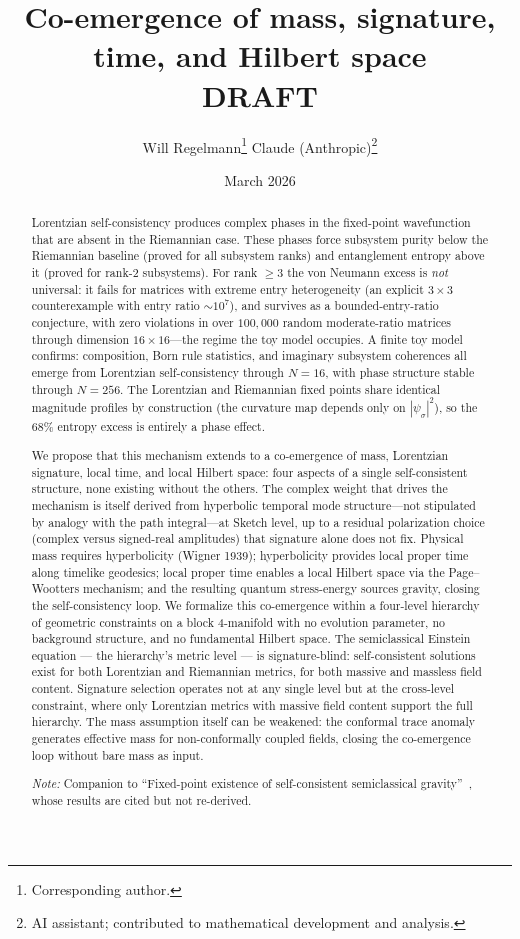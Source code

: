 \documentclass[12pt,a4paper]{article}
\title{\textbf{Co-emergence of mass, signature, time, and Hilbert space}\\[6pt]
{\large DRAFT}}
\author{Will Regelmann\thanks{Corresponding author.} \quad Claude (Anthropic)\thanks{AI
assistant; contributed to mathematical development and analysis.}}
\date{March 2026}
\theoremstyle{definition}
\theoremstyle{remark}
\begin{document}
\maketitle

\begin{abstract}
Lorentzian self-consistency produces complex phases in the fixed-point
wavefunction that are absent in the Riemannian case. These phases force
subsystem purity below the Riemannian baseline (proved for all
subsystem ranks) and entanglement entropy above it (proved for rank-2
subsystems). For rank $\geq 3$ the von Neumann excess is \emph{not}
universal: it fails for matrices with extreme entry heterogeneity (an
explicit $3 \times 3$ counterexample with entry ratio $\sim\!10^7$),
and survives as a bounded-entry-ratio conjecture, with zero violations
in over $100{,}000$ random moderate-ratio matrices through dimension
$16 \times 16$---the regime the toy model occupies. A finite toy model
confirms: composition, Born rule statistics, and imaginary subsystem
coherences all emerge from Lorentzian self-consistency through $N = 16$,
with phase structure
stable through $N = 256$. The Lorentzian and Riemannian fixed points
share identical magnitude profiles by construction (the curvature map
depends only on $|\psi_\sigma|^2$), so the $68\%$ entropy excess is
entirely a phase effect.

We propose that this mechanism extends to a co-emergence of mass,
Lorentzian signature, local time, and local Hilbert space: four aspects
of a single self-consistent structure, none existing without the others.
The complex weight that drives the mechanism is itself derived from
hyperbolic temporal mode structure---not stipulated by analogy with the
path integral---at Sketch level, up to a residual polarization choice
(complex versus signed-real amplitudes) that signature alone does not fix.
Physical mass requires hyperbolicity (Wigner 1939); hyperbolicity
provides local proper time along timelike geodesics; local proper time
enables a local Hilbert space via the Page--Wootters mechanism; and the
resulting quantum stress-energy sources gravity, closing the
self-consistency loop. We formalize this co-emergence within a four-level
hierarchy of geometric constraints on a block 4-manifold with no evolution
parameter, no background structure, and no fundamental Hilbert space.
The semiclassical Einstein equation --- the hierarchy's metric level ---
is signature-blind: self-consistent solutions exist for both Lorentzian
and Riemannian metrics, for both massive and massless field content.
Signature selection operates not at any single level but at the
cross-level constraint, where only Lorentzian metrics with massive field
content support the full hierarchy. The mass assumption itself can be
weakened: the conformal trace anomaly generates effective mass for
non-conformally coupled fields, closing the co-emergence loop without
bare mass as input.

\bigskip\noindent\textit{Note:} Companion to ``Fixed-point existence of
self-consistent semiclassical gravity''~\cite{fixed_point}, whose results
are cited but not re-derived.
\end{abstract}
\end{document}

